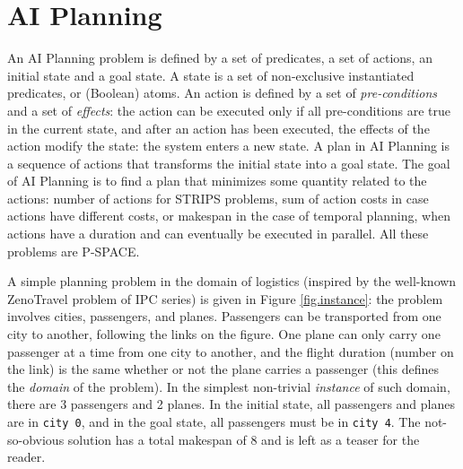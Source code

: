 \documentclass[a4paper,10pt]{article}
\def\ZENO{{\sc ZenoTravel}}
\begin{document}
% 
% 
% 
% 
% 
% 
% 
% 
% 
% 




\section{AI Planning}

An AI Planning problem is defined by a set of predicates, a set of actions, an initial state and a goal state. A state is a set of non-exclusive instantiated predicates, or (Boolean) atoms. An action is defined by a set of {\em pre-conditions} and a set of {\em effects}: the action can be executed only if all pre-conditions are true in the current state, and after an action has been executed, the effects of the action modify the state: the system enters a new state.
A plan in AI Planning is a sequence of actions that transforms the initial state into a  goal state. 
The goal of AI Planning is to find a plan that minimizes some quantity related to the actions: number of actions for STRIPS problems, sum of action costs in case actions have different costs, or makespan in the case of temporal planning, when actions have a duration and can eventually be executed in parallel. All these problems are P-SPACE.

A simple planning problem in the domain of logistics (inspired by the well-known {\ZENO} problem of IPC series) is given in Figure \ref{fig.instance}: the problem involves cities, passengers, and planes. Passengers can be transported from one city to another, following the links on the figure. One plane can only carry one passenger at a time from one city to another, and the flight duration (number on the link) is the same whether or not the plane carries a passenger (this defines the {\em domain} of the problem). In the simplest non-trivial {\em instance} of such domain, there are 3 passengers and 2 planes. In the initial state, all passengers and planes are in {\tt city 0}, and in the goal state, all passengers must be in {\tt city 4}. The not-so-obvious solution has a total makespan of 8 and is left as a teaser for the reader.
\end{document}
